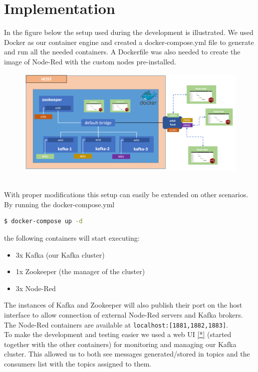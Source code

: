 \documentclass[a4paper, 12pt]{extarticle}
\begin{document}
\section{Implementation}
In the figure below the setup used during the development is illustrated. 
We used Docker as our container engine and created a docker-compose.yml file to generate and run all the needed containers. A Dockerfile was also needed to create the image of Node-Red with the custom nodes pre-installed. 
\begin{figure}[h]
    \centering
    \includegraphics[width=\textwidth]{images/docker.PNG}
    \label{fig:docker}
\end{figure}
\\
With proper modifications this setup can easily be extended on other scenarios.\\
By running the docker-compose.yml
\begin{lstlisting}[language=bash]
  $ docker-compose up -d
\end{lstlisting}
the following containers will start executing:
\begin{itemize}
    \item 3x Kafka (our Kafka cluster)
    \item 1x Zookeeper (the manager of the cluster)
    \item 3x Node-Red
\end{itemize}
The instances of Kafka and Zookeeper will also publish their port on the host interface to allow connection of external Node-Red servers and Kafka brokers.
The Node-Red containers are available at \lstinline{localhost:[1881,1882,1883]}.\\
To make the development and testing easier we used a web UI \href{https://github.com/provectus/kafka-ui}{[*]} (started together with the other containers) for monitoring and managing our Kafka cluster. This allowed us to both see messages generated/stored in topics and the consumers list with the topics assigned to them.
\end{document}
